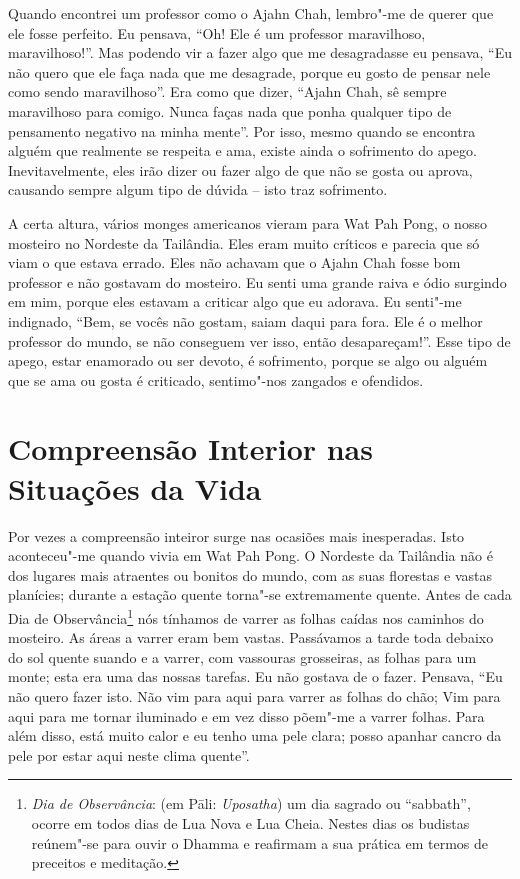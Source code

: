 Quando encontrei um professor como o Ajahn Chah, lembro"-me de querer que ele
fosse perfeito. Eu pensava, “Oh! Ele é um professor maravilhoso, maravilhoso!”.
Mas podendo vir a fazer algo que me desagradasse eu pensava, “Eu não quero que
ele faça nada que me desagrade, porque eu gosto de pensar nele como sendo
maravilhoso”. Era como que dizer, “Ajahn Chah, sê sempre maravilhoso para
comigo. Nunca faças nada que ponha qualquer tipo de pensamento negativo na minha
mente”. Por isso, mesmo quando se encontra alguém que realmente se respeita e
ama, existe ainda o sofrimento do apego. Inevitavelmente, eles irão dizer ou 
fazer algo de que não se gosta ou aprova, causando sempre algum tipo de dúvida 
– isto traz sofrimento.

A certa altura, vários monges americanos vieram para Wat Pah Pong, o nosso
mosteiro no Nordeste da Tailândia. Eles eram muito críticos e parecia que só
viam o que estava errado. Eles não achavam que o Ajahn Chah fosse bom professor
e não gostavam do mosteiro. Eu senti uma grande raiva e ódio surgindo em mim,
porque eles estavam a criticar algo que eu adorava. Eu senti"-me indignado, “Bem,
se vocês não gostam, saiam daqui para fora. Ele é o melhor professor do mundo,
se não conseguem ver isso, então desapareçam!”. Esse tipo de apego, estar
enamorado ou ser devoto, é sofrimento, porque se algo ou alguém que se ama ou
gosta é criticado, sentimo"-nos zangados e ofendidos.

\section{Compreensão Interior nas Situações da Vida}

Por vezes a compreensão inteiror surge nas ocasiões mais inesperadas. Isto aconteceu"-me
quando vivia em Wat Pah Pong. O Nordeste da Tailândia não é dos lugares mais
atraentes ou bonitos do mundo, com as suas florestas e vastas planícies; durante
a estação quente torna"-se extremamente quente. Antes de cada Dia de
Observância\footnote{%
  \emph{Dia de Observância}: (em Pāli: \emph{Uposatha}) um dia sagrado ou
  “sabbath”, ocorre em todos dias de Lua Nova e Lua Cheia. Nestes dias os
  budistas reúnem"-se para ouvir o Dhamma e reafirmam a sua prática em termos de
  preceitos e meditação.} nós tínhamos de varrer as folhas caídas nos caminhos
do mosteiro. As áreas a varrer eram bem vastas. Passávamos a tarde toda debaixo
do sol quente suando e a varrer, com vassouras grosseiras, as folhas para um
monte; esta era uma das nossas tarefas. Eu não gostava de o fazer. Pensava, “Eu
não quero fazer isto. Não vim para aqui para varrer as folhas do chão; Vim para
aqui para me tornar iluminado e em vez disso põem"-me a varrer folhas. Para além
disso, está muito calor e eu tenho uma pele clara; posso apanhar cancro da pele
por estar aqui neste clima quente”.

